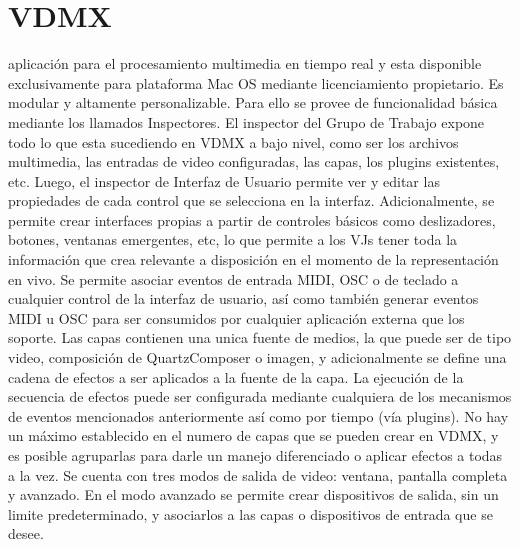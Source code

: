 \section{VDMX}
aplicación para el procesamiento multimedia en tiempo real y esta disponible exclusivamente para plataforma Mac OS mediante licenciamiento propietario. Es modular y altamente personalizable. Para ello se provee de funcionalidad básica mediante los llamados Inspectores. El inspector del Grupo de Trabajo expone todo lo que esta sucediendo en VDMX a bajo nivel, como ser los archivos multimedia, las entradas de video configuradas, las capas, los plugins existentes, etc. Luego, el inspector de Interfaz de Usuario permite ver y editar las propiedades de cada control que se selecciona en la interfaz. Adicionalmente, se permite crear interfaces propias a partir de controles básicos como deslizadores, botones, ventanas emergentes, etc, lo que permite a los VJs tener toda la información que crea relevante a disposición en el momento de la representación en vivo.
Se permite asociar eventos de entrada MIDI, OSC o de teclado a cualquier control de la interfaz de usuario, así como también generar eventos MIDI u OSC para ser consumidos por cualquier aplicación externa que los soporte.
Las capas contienen una unica fuente de medios, la que puede ser de tipo video, composición de QuartzComposer o imagen, y adicionalmente se define una cadena de efectos a ser aplicados a la fuente de la capa. La ejecución de la secuencia de efectos puede ser configurada mediante cualquiera de los mecanismos de eventos mencionados anteriormente así como por tiempo (vía plugins). No hay un máximo establecido en el numero de capas que se pueden crear en VDMX, y es posible agruparlas para darle un manejo diferenciado o aplicar efectos a todas a la vez.
Se cuenta con tres modos de salida de video: ventana, pantalla completa y avanzado. En el modo avanzado se permite crear dispositivos de salida, sin un limite predeterminado, y asociarlos a las capas o dispositivos de entrada que se desee.
